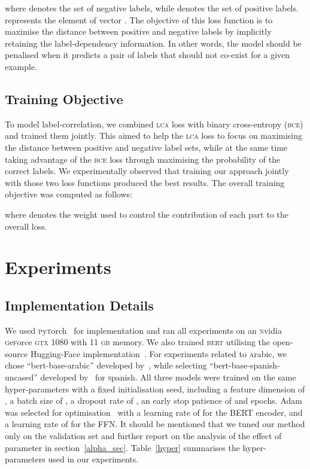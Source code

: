 \documentclass[11pt,a4paper]{article}
\begin{document}
where  denotes the set of negative labels, while  denotes the set of positive labels.  represents the  element of vector . The objective of this loss function is to maximise the distance between positive and negative labels by implicitly retaining the label-dependency information. In other words, the model should be penalised when it predicts a pair of labels that should not co-exist for a given example.

\subsection{Training Objective}
To model label-correlation, we combined \textsc{lca} loss with binary cross-entropy (\textsc{bce}) and trained them jointly. This aimed to help the \textsc{lca} loss to focus on maximising the distance between positive and negative label sets, while at the same time taking advantage of the \textsc{bce} loss through maximising the probability of the correct labels. We experimentally observed that training our approach jointly with those two loss functions produced the best results. The overall training objective was computed as follows: 

where  denotes the weight used to control the contribution of each part to the overall loss.



\section{Experiments} \label{exp}

\subsection{Implementation Details} \label{imp_det}
We used \textsc{p}y\textsc{t}orch~\cite{paszke2017automatic} for implementation and ran all experiments on an \textsc{n}vidia \textsc{g}e\textsc{f}orce \textsc{gtx} 1080 with 11 \textsc{gb} memory. We also trained \textsc{bert} utilising the open-source Hugging-Face implementation~\cite{Wolf2019HuggingFacesTS}. For experiments related to \textsc{a}rabic, we chose ``bert-base-arabic'' developed by~, while selecting ``bert-base-spanish-uncased'' developed by~ for \textsc{s}panish. All three models were trained on the same hyper-parameters with a fixed initialisation seed, including a feature dimension of , a batch size of , a dropout rate of , an early stop patience of  and  epochs. Adam was selected for optimisation~\cite{kingma2014adam} with a learning rate of  for the BERT encoder, and a learning rate of  for the FFN. It should be mentioned that we tuned our method only on the validation set and further report on the analysis of the effect of parameter  in section~\ref{alpha_sec}. Table~\ref{hyper} summarises the hyper-parameters used in our experiments.  
\end{document}
